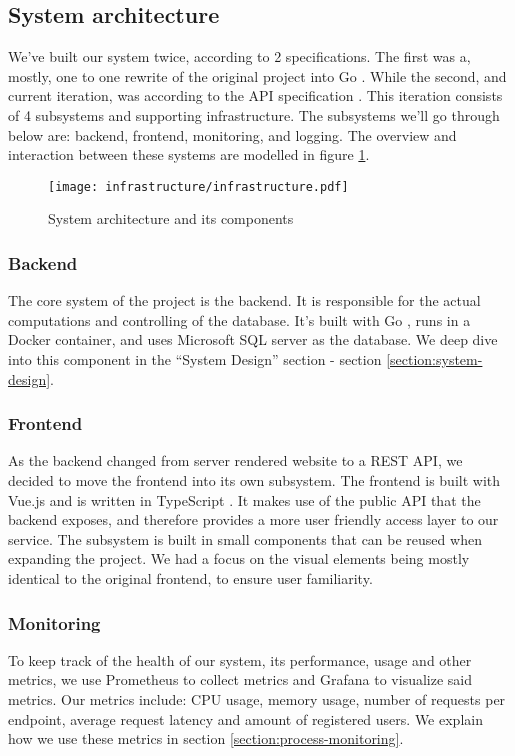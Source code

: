 \subsection{System architecture}
We've built our system twice, according to 2 specifications. The first was a, mostly, one to one rewrite of the original project into Go \cite{tool:go}.
While the second, and current iteration, was according to the API specification \cite{spec:api}. 
This iteration consists of 4 subsystems and supporting infrastructure. The subsystems we'll go through below are: backend, frontend, monitoring, and logging.
The overview and interaction between these systems are modelled in figure \ref{fig:architecture}.
\begin{figure}[H]
    \centering
    \texttt{[image: infrastructure/infrastructure.pdf]}
    \caption{System architecture and its components}
    \label{fig:architecture}
\end{figure}

\subsubsection{Backend}
The core system of the project is the backend. It is responsible for the actual computations and controlling of the database.
It's built with Go \cite{tool:go}, runs in a Docker container, and uses Microsoft SQL server \cite{tool:microsoft-sql-server} as the database. We deep dive into this component in the ``System Design'' section - section \ref{section:system-design}.

\subsubsection{Frontend}
As the backend changed from server rendered website to a REST API, we decided to move the frontend into its own subsystem.
The frontend is built with Vue.js \cite{tool:vue} and is written in TypeScript \cite{tool:typescript}.
It makes use of the public API that the backend exposes, and therefore provides a more user friendly access layer to our service.
The subsystem is built in small components that can be reused when expanding the project. We had a focus on the visual elements being mostly identical to the original frontend, to ensure user familiarity.

\subsubsection{Monitoring}
To keep track of the health of our system, its performance, usage and other metrics, we use Prometheus \cite{tool:prometheus} to collect metrics and Grafana \cite{tool:grafana} to visualize said metrics.
Our metrics include: CPU usage, memory usage, number of requests per endpoint, average request latency and amount of registered users.
We explain how we use these metrics in section \ref{section:process-monitoring}.

